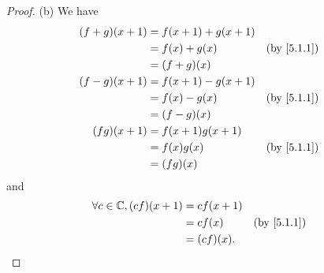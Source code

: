 \begin{proof}{(b)}
  We have
  \begin{align*}
    (f + g)(x + 1) & = f(x + 1) + g(x + 1)                               \\
                   & = f(x) + g(x)         &  & \text{(by \cref{5.1.1})} \\
                   & = (f + g)(x)                                        \\
    (f - g)(x + 1) & = f(x + 1) - g(x + 1)                               \\
                   & = f(x) - g(x)         &  & \text{(by \cref{5.1.1})} \\
                   & = (f - g)(x)                                        \\
    (f g)(x + 1)   & = f(x + 1) g(x + 1)                                 \\
                   & = f(x) g(x)           &  & \text{(by \cref{5.1.1})} \\
                   & = (f g)(x)
  \end{align*}
  and
  \begin{align*}
    \forall c \in \C, (c f)(x + 1) & = c f(x + 1)                               \\
                                   & = c f(x)     &  & \text{(by \cref{5.1.1})} \\
                                   & = (c f)(x).
  \end{align*}
\end{proof}

